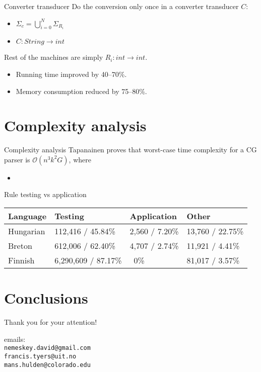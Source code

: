 \documentclass[utf8x,t,aspectratio=169]{beamer}
\newcommand{\vitem}{\item \vspace{4pt}}
\begin{document}
\begin{frame}{Converter transducer}
Do the conversion only once in a converter transducer $C$:
\begin{itemize}
    \vitem $\Sigma_c = \displaystyle \bigcup_{i=0}^N{\Sigma_{R_i}}$
    \vitem $C: String \rightarrow int$
\end{itemize}
Rest of the machines are simply $R_i: int \rightarrow int$.
\begin{itemize}
    \vitem Running time improved by 40--70\%.
    \vitem Memory consumption reduced by 75--80\%.
\end{itemize}
\end{frame}

\section{Complexity analysis}

\begin{frame}{Complexity analysis}
Tapanainen proves that worst-case time complexity for a CG parser is
$\mathcal{O}(n^3k^2G)$, where
\begin{itemize}
    \vitem 
\end{itemize}
\end{frame}

\begin{frame}{Rule testing vs application}

\begin{tabular}{| l | l | l | l |}
\hline
\textbf{Language} & \textbf{Testing} & \textbf{Application} & \textbf{Other} \\
\hline
Hungarian & 112,416 / 45.84\% & 2,560 / 7.20\% & 13,760 / 22.75\% \\
Breton & 612,006 / 62.40\% & 4,707 / 2.74\% & 11,921 / 4.41\% \\
Finnish & 6,290,609 / 87.17\% & ~0\% & 81,017 / 3.57\% \\
\hline
\end{tabular}

\end{frame}

\section{Conclusions}



\begin{frame}

\bigskip

\bigskip

{\huge Thank you for your attention!}

\bigskip
\bigskip
\bigskip

emails: \\ {\tt nemeskey.david@gmail.com \\ francis.tyers@uit.no \\ mans.hulden@colorado.edu} \\

\end{frame}
\end{document}
